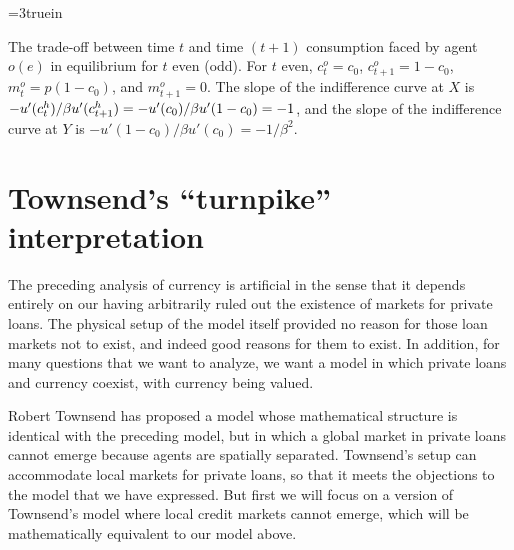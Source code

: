 
\centerline{\epsfxsize=3truein}
\caption{The trade-off between time $t$ and time $(t+1)$ consumption faced
by agent $o(e)$ in equilibrium for $t$ even (odd).  For $t$ even,
$c_t^o =c_0$, $c_{t+1}^o=1-c_0$, $m_t^o=p (1-c_0)$, and $m_{t+1}^o=0$.
The slope of the indifference curve at $X$ is
$-u'(c_t^h)/{\beta} u'(c_{t+1}^h)=-u'(c_0)/{\beta} u'(1-c_0)=-1$, and the slope of
the indifference curve at $Y$ is $-u'(1-c_0)/\beta u'(c_0)=-1/\beta^2$.}
\endfigure
{}
\section{Townsend's ``turnpike'' interpretation}
The preceding analysis of currency is artificial in the sense that it depends
entirely on our having arbitrarily ruled out the existence of markets for
private loans.  The physical setup of the model itself provided no reason for
those loan markets not to exist, and indeed good reasons for them to exist.
In addition, for many questions that we want to analyze, we want a model in
which private loans and currency coexist, with currency being
valued.

Robert Townsend has proposed a model whose mathematical structure is
identical with the preceding model, but in which a global market in
private loans cannot emerge because agents are spatially separated.
Townsend's setup can accommodate local markets for private loans,
so that it meets the objections to the model that we have expressed.
But first we will focus on a version of Townsend's model where
local credit markets cannot emerge, which will be mathematically equivalent
to our model above.

